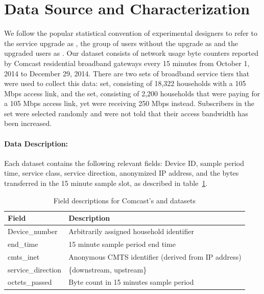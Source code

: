 \section{Data Source and Characterization}\label{sec:data}



We follow the popular statistical convention of experimental designers to 
refer to the service upgrade as \factor{}, the group of users without the 
upgrade as \control{} and the upgraded users as \treatment{} 
\cite{stats-design}. Our dataset consists of network usage byte counters 
reported by Comcast residential broadband gateways every 15 minutes from October 
1, 2014 to December 29, 2014. There are two sets of broadband service tiers that 
were used to collect this data: \control{} set, consisting of 
18,322 households with a 105 Mbps access link, and the 
\treatment{} set, consisting of 2,200 households that were 
paying for a 105 Mbps access link, yet were receiving 250 Mbps instead. 
Subscribers in the \treatment{} set were selected randomly and were not told 
that their access bandwidth has been increased.


\paragraph{Data Description: }Each dataset contains the following relevant 
fields: Device ID, sample period time, service class, service direction, 
anonymized IP address, and the bytes transferred in the 15 minute sample slot, 
as described in table~\ref{tab:field-description}.

\begin{table}[ht]
\small
\begin{tabular}{|l|l|}
\hline
\textbf{Field}         & \textbf{Description}				\\\hline
Device\_number         & Arbitrarily assigned household identifier	\\\hline
end\_time              & 15 minute sample period end time		\\\hline
cmts\_inet             & Anonymous CMTS identifier (derived from IP address) 
\\\hline
service\_direction     & \{downstream, upstream\}                 	\\\hline
octets\_passed         & Byte count in 15 minutes sample period		\\\hline
\end{tabular}
\caption{Field descriptions for Comcast's \control{} and \treatment{} datasets}
\label{tab:field-description}
\end{table}


